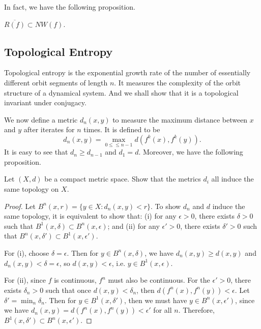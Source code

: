 \documentclass[12pt,a4paper]{article}
\begin{document}
	
	In fact, we have the following proposition.
	\begin{proposition}{}{}
		$\overline{R(f)}\subset NW(f)$.
	\end{proposition}
	
	
	
	
	\subsection{Topological Entropy}
	Topological entropy is the exponential growth rate of the number of essentially different orbit segments of length $n$. It measures the complexity of the orbit structure of a dynamical system. And we shall show that it is a topological invariant under conjugacy.
	
	We now define a metric $d_n(x,y)$ to measure the maximum distance between $x$ and $y$ after iterates for $n$ times. It is defined to be 
	$$
	d_n(x,y) =\max_{0\leq \leq n-1} d(f^k(x),f^k(y)).
	$$
	It is easy to see that $d_n\geq d_{n-1}$ and $d_1=d$. Moreover, we have the following proposition.
	\begin{proposition}{}{}
		Let $(X,d)$ be a compact metric space. Show that the metrics $d_i$ all induce the same topology on $X$.
	\end{proposition}
	\begin{proof}
		Let $B^n(x,r)=\{y\in X: d_n(x,y)<r\}$. To show $d_n$ and $d$ induce the same topology, it is equivalent to show that: (i) for any $\epsilon>0$, there exists $\delta>0$ such that $B^1(x,\delta)\subset B^n(x,\epsilon)$; and (ii) for any $\epsilon'>0$, there exists $\delta'>0$ such that $B^n(x,\delta')\subset B^1(x,\epsilon')$.
		
		For (i), choose $\delta= \epsilon$. Then for $y\in B^n (x,\delta)$, we have $d_n(x,y)\geq d(x,y)$ and $d_n(x,y)<\delta=\epsilon$, so $d(x,y)<\epsilon$, i.e. $y\in B^1(x,\epsilon)$.
		
		For (ii), since $f$ is continuous, $f^n$ must also be continuous. For the $\epsilon'>0$, there exists $\delta_n>0$ such that once $d(x,y)<\delta_n$, then $d(f^n(x),f^n(y))<\epsilon$. Let $\delta'=\min_n \delta_n$. Then for $y\in B^1(x,\delta')$, then we must have $y\in B^n (x,\epsilon')$, since we have $d_n(x,y)=d(f^n(x),f^n(y))<\epsilon'$ for all $n$. Therefore, $B^1(x,\delta')\subset B^n (x,\epsilon')$.
	\end{proof}
	
	\newcommand{\spn}{\text{span}}
	\newcommand{\sep}{\text{sep}}
	\newcommand{\cov}{\text{cov}}
	
\end{document}
